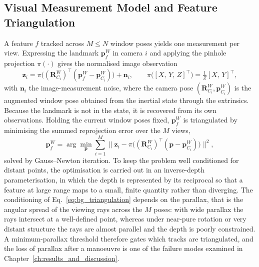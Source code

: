 \subsection{Visual Measurement Model and Feature Triangulation}
\label{sec:bg_measurement}
A feature $f$ tracked across $M \le N$ window poses yields one measurement per view. Expressing the landmark $\mathbf{p}_f^{W}$ in camera $i$ and applying the pinhole projection $\pi(\cdot)$ gives the normalised image observation
\begin{equation}
  \mathbf{z}_i = \pi\!\big( (\mathbf{R}_{C_i}^{W})^{\top}(\mathbf{p}_f^{W} - \mathbf{p}_{C_i}^{W}) \big) + \mathbf{n}_i,
  \qquad \pi\big([X,\,Y,\,Z]^{\top}\big) = \tfrac{1}{Z}[X,\,Y]^{\top},
\end{equation}
with $\mathbf{n}_i$ the image-measurement noise, where the camera pose $(\mathbf{R}_{C_i}^{W}, \mathbf{p}_{C_i}^{W})$ is the augmented window pose obtained from the inertial state through the extrinsics. Because the landmark is not in the state, it is recovered from its own observations. Holding the current window poses fixed, $\mathbf{p}_f^{W}$ is triangulated by minimising the summed reprojection error over the $M$ views,
\begin{equation}
  \mathbf{p}_f^{W} = \arg\min_{\mathbf{p}} \sum_{i=1}^{M} \big\lVert \mathbf{z}_i - \pi\big((\mathbf{R}_{C_i}^{W})^{\top}(\mathbf{p} - \mathbf{p}_{C_i}^{W})\big) \big\rVert^2,
  \label{eq:bg_triangulation}
\end{equation}
solved by Gauss--Newton iteration. To keep the problem well conditioned for distant points, the optimisation is carried out in an inverse-depth parameterisation, in which the depth is represented by its reciprocal so that a feature at large range maps to a small, finite quantity rather than diverging. The conditioning of Eq.~\ref{eq:bg_triangulation} depends on the parallax, that is the angular spread of the viewing rays across the $M$ poses: with wide parallax the rays intersect at a well-defined point, whereas under near-pure rotation or very distant structure the rays are almost parallel and the depth is poorly constrained. A minimum-parallax threshold therefore gates which tracks are triangulated, and the loss of parallax after a manoeuvre is one of the failure modes examined in Chapter~\ref{ch:results_and_discussion}.

